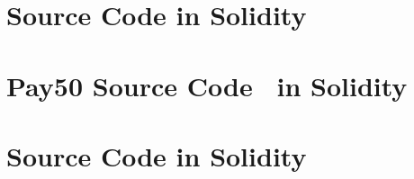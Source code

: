 
\section{\ew Source Code in Solidity}
\label{sec:code}


\clearpage

\section{\textsf{Pay50} Source Code~\cite{DF17} in Solidity}
\label{sec:pay50}


\clearpage

\section{\eww Source Code in Solidity}
\label{sec:eww}














